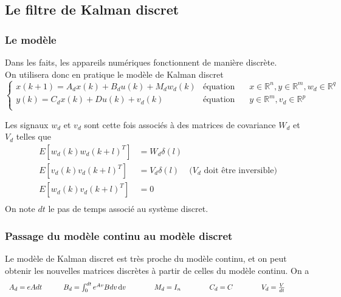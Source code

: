 \documentclass[12pt,twoside,a4paper]{article}
\begin{document}
\subsection{Le filtre de Kalman discret}

\subsubsection{Le modèle}
Dans les faits, les appareils numériques fonctionnent de manière discrète. \\
On utilisera donc en pratique le modèle de Kalman discret
$$
\left\{ 
\begin{array}{lll}
        x(k+1) = A_d x(k) + B_d u(k) +M_d w_d(k) & \text{équation d'état} & x \in \mathbb{R}^n, y \in \mathbb{R}^m, w_d \in \mathbb{R}^q\\
       y(k) = C_d x(k) + Du(k) + v_d(k) & \text{équation de mesure} & y \in \mathbb{R}^m, v_d \in \mathbb{R}^p\\
\end{array}
\right.
$$

Les signaux $w_d$ et $v_d$ sont cette fois associés à des matrices de covariance $W_d$ et $V_d$ telles que
$$
\begin{array}{lll}
E[w_d(k) w_d(k+l)^T ] &= W_d \delta(l) &  \\
E[v_d(k) v_d(k+l)^T ] &= V_d \delta(l) & \text{($V_d$ doit être inversible)}\\
E[w_d(k) v_d(k+l)^T ] &= 0 & \\
\end{array}
$$
On note $dt$ le pas de temps associé au système discret.\\

\subsubsection{Passage du modèle continu au modèle discret}

\vspace{0.3cm}
Le modèle de Kalman discret est très proche du modèle continu, et on peut obtenir les nouvelles matrices discrètes à partir de celles du modèle continu. On a
$$ \begin{array}{ccccc}
A_d = e{Adt} \rule[0pt]{30pt}{0pt}
B_d = \int_0^{dt} e^{Av}Bdv \, \mathrm{d}v \rule[0pt]{30pt}{0pt}& 
M_d = I_n \rule[0pt]{30pt}{0pt}&
C_d = C\rule[0pt]{30pt}{0pt} & 
V_d= \frac{V}{dt}\rule[0pt]{30pt}{0pt}\\
\end{array} $$
\end{document}
